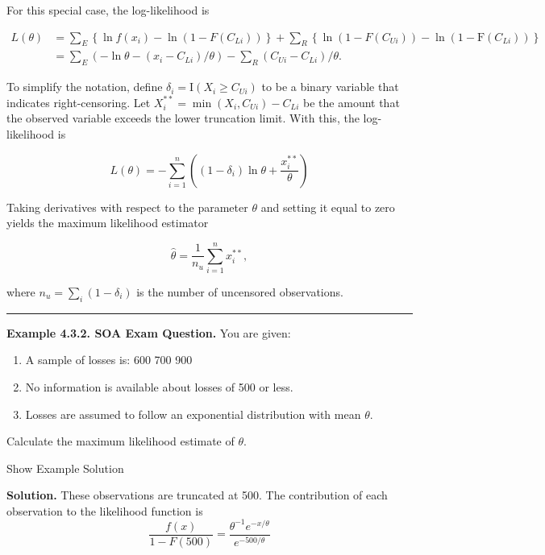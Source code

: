 \documentclass[]{book}
\providecommand{\tightlist}{%
  \setlength{\itemsep}{0pt}\setlength{\parskip}{0pt}}
\theoremstyle{definition}
\theoremstyle{definition}
\theoremstyle{definition}
\theoremstyle{remark}
\begin{document}
For this special case, the log-likelihood is

\[\begin{aligned}
L(\theta) &= \sum_{E} \left\{ \ln f(x_i) - \ln (1-F(C_{Li})) \right\} + \sum_{R}\left\{ \ln (1-F(C_{Ui}))- \ln (1-\mathrm{F}(C_{Li})) \right\}\\
&= \sum_{E} (-\ln \theta -(x_i-C_{Li})/\theta ) -\sum_{R} (C_{Ui}-C_{Li})/\theta .
\end{aligned}\]

To simplify the notation, define
\(\delta_i = \mathrm{I}(X_i \geq C_{Ui})\) to be a binary variable that
indicates right-censoring. Let
\(X_i^{\ast \ast} = \min(X_i, C_{Ui}) - C_{Li}\) be the amount that the
observed variable exceeds the lower truncation limit. With this, the
log-likelihood is

\begin{equation} 
  L(\theta) =  - \sum_{i=1}^n ((1-\delta_i) \ln \theta + \frac{x_i^{\ast \ast}}{\theta})
  \label{eq:EXPloglik}
\end{equation}

Taking derivatives with respect to the parameter \(\theta\) and setting
it equal to zero yields the maximum likelihood estimator

\[\widehat{\theta}  = \frac{1}{n_u} \sum_{i=1}^n  x_i^{\ast \ast},\]

where \(n_u = \sum_i (1-\delta_i)\) is the number of uncensored
observations.

\begin{center}\rule{0.5\linewidth}{\linethickness}\end{center}

\textbf{Example 4.3.2. SOA Exam Question.} You are given:

\begin{enumerate}
\def\labelenumi{(\roman{enumi})}
\tightlist
\item
  A sample of losses is: 600 700 900
\item
  No information is available about losses of 500 or less.
\item
  Losses are assumed to follow an exponential distribution with mean
  \(\theta\).
\end{enumerate}

Calculate the maximum likelihood estimate of \(\theta\).

Show Example Solution

\hypertarget{toggleExampleSelect.3.2}{}
\textbf{Solution.} These observations are truncated at 500. The
contribution of each observation to the likelihood function is
\[\frac{f(x)}{1-F(500)} = \frac{\theta^{-1}e^{-x/\theta}}{e^{-500/\theta}}\]
\end{document}
